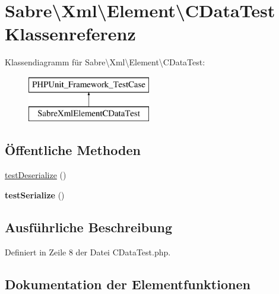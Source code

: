 \hypertarget{class_sabre_1_1_xml_1_1_element_1_1_c_data_test}{}\section{Sabre\textbackslash{}Xml\textbackslash{}Element\textbackslash{}C\+Data\+Test Klassenreferenz}
\label{class_sabre_1_1_xml_1_1_element_1_1_c_data_test}
Klassendiagramm für Sabre\textbackslash{}Xml\textbackslash{}Element\textbackslash{}C\+Data\+Test\+:\begin{figure}[H]
\begin{center}
\leavevmode
\includegraphics[height=2.000000cm]{class_sabre_1_1_xml_1_1_element_1_1_c_data_test}
\end{center}
\end{figure}
\subsection*{Öffentliche Methoden}
\begin{DoxyCompactItemize}
\item 
\mbox{\hyperlink{class_sabre_1_1_xml_1_1_element_1_1_c_data_test_a059d099418782617085b87f0459e613a}{test\+Deserialize}} ()
\item 
\mbox{\label{class_sabre_1_1_xml_1_1_element_1_1_c_data_test_a71ec33d57763fdd84e5afd78def0911b}} 
{\bfseries test\+Serialize} ()
\end{DoxyCompactItemize}


\subsection{Ausführliche Beschreibung}


Definiert in Zeile 8 der Datei C\+Data\+Test.\+php.



\subsection{Dokumentation der Elementfunktionen}
\mbox{\label{class_sabre_1_1_xml_1_1_element_1_1_c_data_test_a059d099418782617085b87f0459e613a}} 
